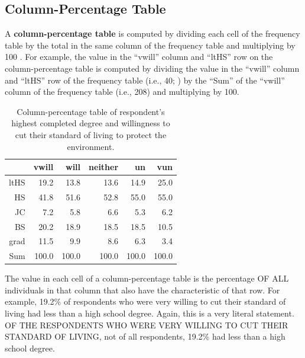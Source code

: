 \documentclass[10pt,openany]{book}\usepackage[]{graphicx}\usepackage[]{color}
\begin{document}
\vspace{-12pt}

\subsection{Column-Percentage Table}
\vspace{-12pt}
A \textbf{column-percentage table} is computed by dividing each cell of the frequency table by the total in the same column of the frequency table and multiplying by 100 .  For example, the value in the ``vwill'' column and ``ltHS'' row on the column-percentage table is computed by dividing the value in the ``vwill'' column and ``ltHS'' row of the frequency table (i.e., 40; ) by the ``Sum'' of the ``vwill'' column of the frequency table (i.e., 208) and multiplying by 100.

\begin{table}[ht]
\centering
\caption{Column-percentage table of respondent's highest completed degree and willingness to cut their standard of living to protect the environment.} 
\label{tab:EnvColP}
\begin{tabular}{rrrrrr}
  \hline
 & vwill & will & neither & un & vun \\ 
  \hline
ltHS & 19.2 & 13.8 & 13.6 & 14.9 & 25.0 \\ 
  HS & 41.8 & 51.6 & 52.8 & 55.0 & 55.0 \\ 
  JC & 7.2 & 5.8 & 6.6 & 5.3 & 6.2 \\ 
  BS & 20.2 & 18.9 & 18.5 & 18.5 & 10.5 \\ 
  grad & 11.5 & 9.9 & 8.6 & 6.3 & 3.4 \\ 
  Sum & 100.0 & 100.0 & 100.0 & 100.0 & 100.0 \\ 
   \hline
\end{tabular}
\end{table}


The value in each cell of a column-percentage table is the percentage OF ALL individuals in that column that also have the characteristic of that row.  For example, 19.2\% of respondents who were very willing to cut their standard of living had less than a high school degree.  Again, this is a very literal statement.  OF THE RESPONDENTS WHO WERE VERY WILLING TO CUT THEIR STANDARD OF LIVING, not of all respondents, 19.2\% had less than a high school degree.
\end{document}
